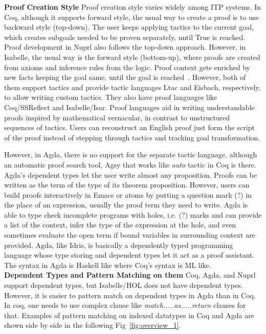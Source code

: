 \textbf{Proof Creation Style}
Proof creation style varies widely among ITP systems. In Coq, although it supports forward style, the usual way to create a proof is to use backward style (top-down). The user keeps applying tactics to the current goal, which creates subgoals needed to be proven separately, until True is reached. Proof development in Nuprl also follows the top-down approach. However, in Isabelle, the usual way is the forward style (bottom-up), where proofs are created from axioms and inference rules from the logic. Proof context gets enriched by new facts keeping the goal same, until the goal is reached~\cite{Yushkovskiy_Tripakis_2018}. However, both of them support tactics and provide tactic languages Ltac and Eisbach, respectively, to allow writing custom tactics. They also have proof languages like Coq/SSReflect and Isabelle/Isar. Proof languages aid in writing understandable proofs inspired by mathematical vernacular, in contrast to unstructured sequences of tactics. Users can reconstruct an English proof just form the script of the proof instead of stepping through tactics and tracking goal transformation. 

However, in Agda, there is no support for the separate tactic language, although an automatic proof search tool, Agsy that works like \emph{auto} tactic in Coq is there. Agda's dependent types let the user write almost any proposition. Proofs can be written as the term of the type of its theorem proposition. However, users can build proofs interactively in Emacs or atoms by putting a question mark (?) in the place of an expression, usually the proof term they need to write. Agda is able to type check incomplete programs with holes, i.e. (?) marks and can provide a list of the context, infer the type of the expression at the hole, and even sometimes evaluate the open term if bound variables in surrounding context are provided. Agda, like Idris, is basically a dependently typed programming language whose type storing and dependent types let it act as a proof assistant. The syntax in Agda is Haskell like where Coq's syntax is ML like. \\

\textbf{Dependent Types and Pattern Matching on them} 
Coq, Agda, and Nuprl support dependent types, but Isabelle/HOL does not have dependent types. However, it is easier to pattern match on dependent types in Agda than in Coq. In coq, one needs to use complex clause like \emph{match.....as.....return} clauses for that. Examples of pattern matching on indexed datatypes in Coq and Agda are shown side by side in the following Fig~\ref{fig:overview_1}.  \\


